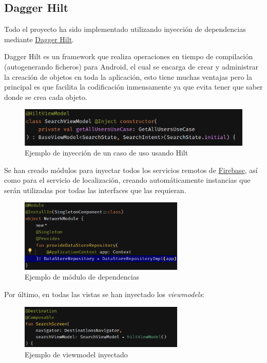 \subsection{Dagger Hilt}
Todo el proyecto ha sido implementado utilizando inyección de dependencias mediante \href{https://dagger.dev/hilt/}{Dagger Hilt}. 

Dagger Hilt es un framework que realiza operaciones en tiempo de compilación (autogenerando ficheros) para Android, el cual se encarga de crear y administrar la creación de objetos en toda la aplicación, esto tiene muchas ventajas pero la principal es que facilita la codificación inmensamente ya que evita tener que saber donde se crea cada objeto.
\begin{figure}[h]
	\centering
	\includegraphics[width = 1\textwidth]{Imagenes/Fuentes/ejemplo_hilt1.png}
	\caption{Ejemplo de inyección de un caso de uso usando Hilt}
	\label{fig:ejemplo_hilt1}
\end{figure}

Se han creado módulos para inyectar todos los servicios remotos de \hyperlink{subsec:firebase}{Firebase}, así como para el servicio de localización, creando automáticamente instancias que serán utilizadas por todas las interfaces que las requieran.
\newpage
\begin{figure}[h]
	\centering
	\includegraphics[width = 0.7\textwidth]{Imagenes/Fuentes/ejemplo_hilt2.png}
	\caption{Ejemplo de módulo de dependencias}
	\label{fig:ejemplo_hilt2}
\end{figure}

Por último, en todas las vistas se han inyectado los \textit{viewmodels}:
\begin{figure}[h]
	\centering
	\includegraphics[width = 0.7\textwidth]{Imagenes/Fuentes/ejemplo_hilt3.png}
	\caption{Ejemplo de viewmodel inyectado}
	\label{fig:ejemplo_hilt3}
\end{figure}

